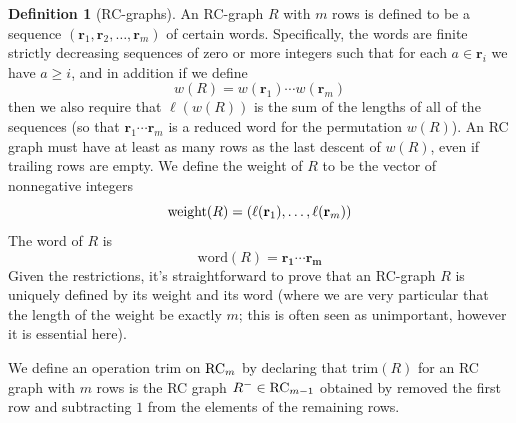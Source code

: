 \documentclass{elsarticle}
\theoremstyle{definition}
\newtheorem{definition}[lemma]{Definition}
\theoremstyle{remark}
\numberwithin{equation}{subsection}
\newcommand{\code}{\mathfrak{c}}
\begin{document}
\begin{definition}[RC-graphs]
An RC-graph $R$ with $m$ rows is defined to be a sequence $(\mathbf{r}_1,\mathbf{r}_2,\ldots,\mathbf{r}_m)$ of certain words. Specifically, the words are finite strictly decreasing sequences of zero or more integers such that for each $a\in\mathbf{r}_i$ we have $a\geq i$, and in addition if we define 
$$w(R)= w(\mathbf{r}_1)\cdots w(\mathbf{r}_m)$$
then we also require that $\ell(w(R))$ is the sum of the lengths of all of the sequences (so that $\mathbf{r}_1\cdots\mathbf{r}_m$ is a reduced word for the permutation $w(R)$). An RC graph must have at least as many rows as the last descent of $w(R)$, even if trailing rows are empty.
We define the weight of $R$ to be the vector of nonnegative integers
$$\mathrm{weight}(R)=(\ell(\mathbf{r}_1),\ldots,\ell(\mathbf{r}_m))$$
The word of $R$ is 
$$\mathrm{word}(R) = \mathbf{r_1}\cdots\mathbf{r_m}$$
Given the restrictions, it's straightforward to prove that an RC-graph $R$ is uniquely defined by its weight and its word (where we are very particular that the length of the weight be exactly $m$; this is often seen as unimportant, however it is essential here).
\end{definition}
\newcommand{\tr}{\mathrm{trim}}

We define an operation $\tr$ on $\mathrm{RC}_m$ by declaring that $\tr(R)$ for an RC graph with $m$ rows is the RC graph $R^-\in\mathrm{RC}_{m-1}$ obtained by removed the first row and subtracting $1$ from the elements of the remaining rows.


	


\end{document}
